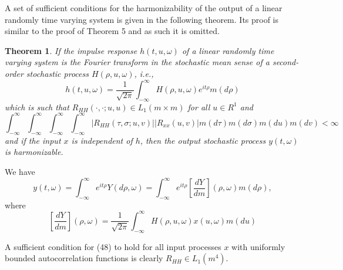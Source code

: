 \documentclass{article}
\newtheorem{theorem}{Theorem}
\begin{document}
A set of sufficient conditions for the harmonizability of the output of a linear randomly time varying system is given in the following theorem. Its proof is similar to the proof of Theorem 5 and as such it is omitted.

\begin{theorem}
If the impulse response $h(t, u, \omega)$ of a linear randomly time varying system is the Fourier transform in the stochastic mean sense of a second-order stochastic process $H(\rho, u, \omega)$, i.e.,
\[
h(t, u, \omega)=\frac{1}{\sqrt{2 \pi}} \int_{-\infty}^{\infty} H(\rho, u, \omega) e^{i t \rho} m(d \rho)
\]
which is such that $R_{H H}(\cdot, \cdot ; u, u) \in L_{1}(m \times m)$ for all $u \in R^{1}$ and
\[
\int_{-\infty}^{\infty} \int_{-\infty}^{\infty} \int_{-\infty}^{\infty} \int_{-\infty}^{\infty} |R_{H H}(\tau, \sigma ; u, v)||R_{x x}(u, v)| m(d \tau) m(d \sigma) m(d u) m(d v)<\infty
\]
and if the input $x$ is independent of $h$, then the output stochastic process $y(t, \omega)$ is harmonizable.
\end{theorem}

We have
\[
y(t, \omega)=\int_{-\infty}^{\infty} e^{i t \rho} Y(d \rho, \omega)=\int_{-\infty}^{\infty} e^{i t \rho}\left[\frac{d Y}{d m}\right](\rho, \omega) m(d \rho),
\]
where
\[
\left[\frac{d Y}{d m}\right](\rho, \omega)=\frac{1}{\sqrt{2 \pi}} \int_{-\infty}^{\infty} H(\rho, u, \omega) x(u, \omega) m(d u)
\]

A sufficient condition for (48) to hold for all input processes $x$ with uniformly bounded autocorrelation functions is clearly $R_{H H} \in L_{1}(m^{4})$.
\end{document}
